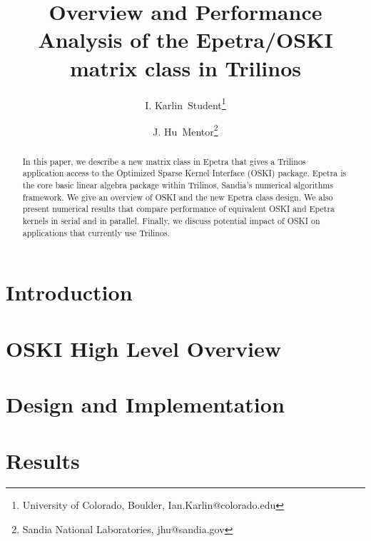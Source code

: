 \documentclass{csri08}
\title{
Overview and Performance Analysis of the Epetra/OSKI matrix class in Trilinos
}
\author{I. Karlin\ Student\thanks{University of Colorado, Boulder, Ian.Karlin@colorado.edu} \and J. Hu\ Mentor\thanks{Sandia National Laboratories,
jhu@sandia.gov}}
\begin{document}
\maketitle

\begin{abstract}
In this paper, we describe a new matrix class in Epetra that gives a Trilinos application access to the Optimized Sparse Kernel
Interface (OSKI) package.  Epetra is the core basic linear algebra package within Trilinos, Sandia's
numerical algorithms framework.
We give an overview of OSKI and the new Epetra class design.
We also present numerical results that compare performance of equivalent OSKI and Epetra kernels in serial
and in parallel.  Finally, we discuss potential impact of OSKI on applications that currently use
Trilinos.
\end{abstract}

\section{Introduction} \label{IK:sec:intro}


\section{OSKI High Level Overview} \label{IK:sec:oski}


\section{Design and Implementation} \label{IK:sec:design}


\section{Results} \label{IK:sec:results}

\end{document}

